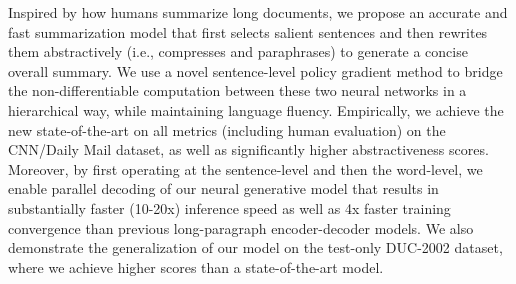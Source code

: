 Inspired by how humans summarize long documents, we propose an accurate and fast summarization model that first selects salient sentences and then rewrites them abstractively (i.e., compresses and paraphrases) to generate a concise overall summary. We use a novel sentence-level policy gradient method to bridge the non-differentiable computation between these two neural networks in a hierarchical way, while maintaining language fluency. Empirically, we achieve the new state-of-the-art on all metrics (including human evaluation) on the CNN/Daily Mail dataset, as well as significantly higher abstractiveness scores. Moreover, by first operating at the sentence-level and then the word-level, we enable parallel decoding of our neural generative model that results in substantially faster (10-20x) inference speed as well as 4x faster training convergence than previous long-paragraph encoder-decoder models. We also demonstrate the generalization of our model on the test-only DUC-2002 dataset, where we achieve higher scores than a state-of-the-art model.
